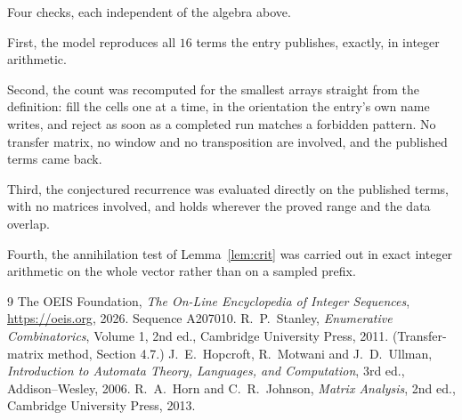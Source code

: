 \documentclass[11pt,a4paper]{article}
\theoremstyle{plain}
\theoremstyle{definition}
\begin{document}
Four checks, each independent of the algebra above.

First, the model reproduces all $16$ terms the entry publishes, exactly, in integer
arithmetic.

Second, the count was recomputed for the smallest arrays straight from the definition: fill the
cells one at a time, in the orientation the entry's own name writes, and reject as soon as a
completed run matches a forbidden pattern. No transfer matrix, no window and no transposition
are involved, and the published terms came back.

Third, the conjectured recurrence was evaluated directly on the published terms, with no
matrices involved, and holds wherever the proved range and the data overlap.

Fourth, the annihilation test of Lemma~\ref{lem:crit} was carried out in exact integer
arithmetic on the whole vector rather than on a sampled prefix.

\begin{thebibliography}{9}
 The OEIS Foundation, \emph{The On-Line Encyclopedia of Integer
Sequences}, \url{https://oeis.org}, 2026. Sequence A207010.
 R.~P.~Stanley, \emph{Enumerative Combinatorics}, Volume 1, 2nd ed.,
Cambridge University Press, 2011. (Transfer-matrix method, Section 4.7.)
 J.~E.~Hopcroft, R.~Motwani and J.~D.~Ullman, \emph{Introduction to Automata
Theory, Languages, and Computation}, 3rd ed., Addison--Wesley, 2006.
 R.~A.~Horn and C.~R.~Johnson, \emph{Matrix Analysis}, 2nd ed., Cambridge
University Press, 2013.
\end{thebibliography}
\end{document}
